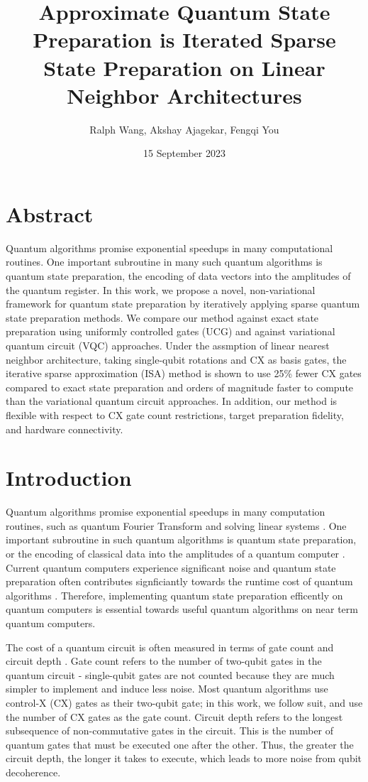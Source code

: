 \documentclass{article}
\begin{document}
\title{Approximate Quantum State Preparation is Iterated Sparse State Preparation on Linear Neighbor Architectures}
\author{Ralph Wang, Akshay Ajagekar, Fengqi You}
\date{15 September 2023}
\maketitle

\section*{Abstract}
Quantum algorithms promise exponential speedups in many computational routines.
One important
subroutine in many such quantum algorithms is quantum state preparation, the
encoding of data vectors into the amplitudes of the quantum register. In this
work, we propose a novel, non-variational framework for quantum state 
preparation by iteratively applying sparse quantum state preparation methods.
We compare our method against exact state preparation using uniformly controlled
gates (UCG) and against variational quantum circuit (VQC) approaches. Under the
assmption of linear nearest neighbor architecture, taking single-qubit rotations
and CX as basis gates, the iterative sparse approximation (ISA) method is shown 
to use 25\% fewer CX gates compared to exact state preparation and orders of 
magnitude faster to compute than the variational quantum circuit approaches. In
addition, our method is flexible with respect to CX gate count restrictions, 
target preparation fidelity, and hardware connectivity.

\section{Introduction}
Quantum algorithms promise exponential speedups in many computation routines, 
such as quantum Fourier Transform \cite{shor1994algorithms} and solving linear systems \cite{PhysRevLett.103.150502}. One important
subroutine in such quantum algorithms is quantum state preparation, or the 
encoding of classical data into the amplitudes of a quantum computer \cite{aaronson2015read}. Current
quantum computers experience significant noise and quantum state preparation
often contributes signficiantly towards the runtime cost of quantum
algorithms \cite{aaronson2015read}. Therefore, implementing quantum state preparation efficently on
quantum computers is essential towards useful quantum algorithms on near term
quantum computers.

The cost of a quantum circuit is often measured in terms of gate count and
circuit depth \cite{1629135}. Gate count refers to the number of two-qubit gates in the
quantum circuit - single-qubit gates are not counted because they are much
simpler to implement and induce less noise. Most quantum algorithms use
control-X (CX) gates as their two-qubit gate; in this work, we follow suit, and
use the number of CX gates as the gate count. Circuit depth refers to the 
longest subsequence of non-commutative gates in the circuit. This is the number 
of quantum gates that must be executed one after the other. Thus, the greater 
the circuit depth, the longer it takes to execute, which leads to more noise 
from qubit decoherence.
\end{document}
